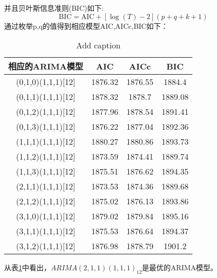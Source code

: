 \documentclass[12pt,a4paper]{nmmcm}
\begin{document}
  并且贝叶斯信息准则(BIC)如下:\[\text{BIC} = \text{AIC} + [\log(T)-2](p+q+k+1)\]
  通过枚举p,q的值得到相应模型AIC,AICc,BIC如下：
\begin{table}[htbp]
  \centering
  \caption{Add caption}
    \begin{tabular}{c|ccc}
    相应的ARIMA模型 & AIC   & AICc  & BIC \\
    \hline
    (0,1,0)(1,1,1)[12] & 1876.32 & 1876.55 & 1884.4 \\
    (0,1,1)(1,1,1)[12] & 1878.32 & 1878.7 & 1889.08 \\
    (0,1,2)(1,1,1)[12] & 1877.96 & 1878.54 & 1891.41 \\
    (0,1,3)(1,1,1)[12]  & 1876.22 & 1877.04 & 1892.36 \\
    (1,1,1)(1,1,1)[12] & 1880.27 & 1880.86 & 1893.73 \\
    (1,1,2)(1,1,1)[12] & 1873.59 & 1874.41 & 1889.74 \\
    (1,1,3)(1,1,1)[12] & 1875.51 & 1876.62 & 1894.35 \\
    (2,1,1)(1,1,1)[12] & 1873.53 & 1874.36 & 1889.68 \\
    (2,1,2)(1,1,1)[12] & 1875.02 & 1876.13 & 1893.86 \\
    (3,1,0)(1,1,1)[12] & 1879.02 & 1879.84 & 1895.16 \\
    (3,1,1)(1,1,1)[12] & 1875.53 & 1876.64 & 1894.37 \\
    (3,1,2)(1,1,1)[12] & 1876.98 & 1878.79 & 1901.2 \\
    \end{tabular}%
  \label{choose optimal models}%
\end{table}%

  从表\ref{choose optimal models}中看出，\(ARIMA(2,1,1)(1,1,1)_{12}\)是最优的ARIMA模型。
\end{document}
